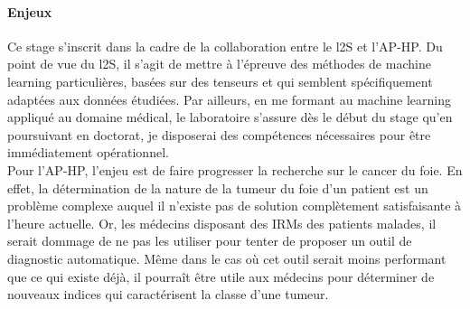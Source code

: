 \documentclass[preprint,12pt]{elsarticle}
\begin{document}
\paragraph*{Enjeux} Ce stage s'inscrit dans la cadre de la collaboration entre le l2S et l'AP-HP. Du point de vue du l2S, il s'agit de mettre à l'épreuve des méthodes de machine learning particulières, basées sur des tenseurs et qui semblent spécifiquement adaptées aux données étudiées. Par ailleurs, en me formant au machine learning appliqué au domaine médical, le laboratoire s'assure dès le début du stage qu'en poursuivant en doctorat, je disposerai des compétences nécessaires pour être immédiatement opérationnel.\\
\indent Pour l'AP-HP, l'enjeu est de faire progresser la recherche sur le cancer du foie. En effet, la détermination de la nature de la tumeur du foie d'un patient est un problème complexe auquel il n'existe pas de solution complètement satisfaisante à l'heure actuelle. Or, les médecins disposant des IRMs des patients malades, il serait dommage de ne pas les utiliser pour tenter de proposer un outil de diagnostic automatique. Même dans le cas où cet outil serait moins performant que ce qui existe déjà, il pourraît être utile aux médecins pour déterminer de nouveaux indices qui caractérisent la classe d'une tumeur.
\end{document}

